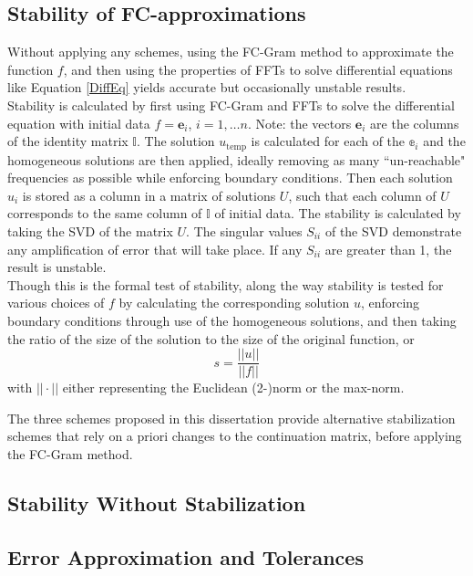 \documentclass[11pt]{amsart}
\begin{document}
\subsection{Stability of FC-approximations}
Without applying any schemes, using the FC-Gram method to approximate the function $f$, and then using the properties of FFTs to solve differential equations like Equation \ref{DiffEq} yields accurate but occasionally unstable results.  \\
Stability is calculated by first using FC-Gram and FFTs to solve the differential equation with initial data $f=\mathbf{e}_i$, $i=1,\ldots n$. Note: the vectors $\mathbf{e}_i$ are the columns of the identity matrix $\mathbb{I}$. 
The solution $u_{\text{temp}}$ is calculated for each of the $\mathbb{e}_i$ and the homogeneous solutions are then applied, ideally removing as many ``un-reachable" frequencies as possible while enforcing boundary conditions.  
Then each solution $u_i$ is stored as a column in a matrix of solutions $U$, such that each column of $U$ corresponds to the same column of $\mathbb{I}$ of initial data. 
The stability is calculated by taking the SVD of the matrix $U$.  The singular values $S_{ii}$ of the SVD demonstrate any amplification of error that will take place.  If any $S_{ii}$ are greater than 1, the result is unstable.   
\\
Though this is the formal test of stability, along the way stability is tested for various choices of $f$ by calculating the corresponding solution $u$, enforcing boundary conditions through use of the homogeneous solutions, and then taking the ratio of the size of the solution to the size of the original function, or 
\begin{equation}
s=\dfrac{||u||}{||f||}
\end{equation}
with $|| \cdot ||$ either representing the Euclidean (2-)norm or the max-norm. 


The three schemes proposed in this dissertation provide alternative stabilization schemes that rely on a priori changes to the continuation matrix, before applying the FC-Gram method. 

\subsection{Stability Without Stabilization}


\subsection{Error Approximation and Tolerances}
%
%
%
\end{document}
